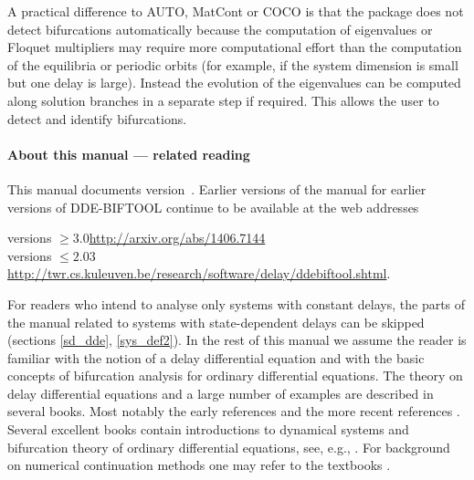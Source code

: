 \documentclass[10pt]{scrartcl}
\newcommand{\DDEBIFCODE}{\textsc{DDE-BIFTOOL}}
\newcommand{\ddebifweb}{\url{https://sourceforge.net/projects/ddebiftool}}
\newcommand{\ddebifarx}{\url{http://arxiv.org/abs/1406.7144}}
\newcommand{\ddebifwebold}{\url{http://twr.cs.kuleuven.be/research/software/delay/ddebiftool.shtml}}
\begin{document}
A practical difference to AUTO, MatCont or \textsc{COCO} is that the package
does not detect bifurcations automatically because the computation of
eigenvalues or Floquet multipliers may require more computational
effort than the computation of the equilibria or periodic orbits (for
example, if the system dimension is small but one delay is
large). Instead the evolution of the eigenvalues can be computed along
solution branches in a separate step if required. This allows the user
to detect and identify bifurcations.



\paragraph{About this manual --- related reading}
This manual documents version~\version. Earlier versions of the manual
for earlier versions of \DDEBIFCODE{} continue to be available at the
web addresses
\begin{tabbing}
  versions $\geq3.0$\qquad \= \ddebifarx{}\\
  versions $\leq2.03$ \> \ddebifwebold{}.
\end{tabbing}
For readers who intend to analyse only systems with constant delays,
the parts of the manual related to systems with state-dependent delays
can be skipped (sections \ref{sd_dde}, \ref{sys_def2}).  In the rest
of this manual we assume the reader is familiar with the notion of a
delay differential equation and with the basic concepts of bifurcation
analysis for ordinary differential equations.  The theory on delay
differential equations and a large number of examples are described in
several books. Most notably the early references
\cite{Bell63,Driv77,El's73,Hale77a,Kolm86} and the more recent
references \cite{Azbe91,Kolm92,Hale93,Diek95,Kolm99}.  Several
excellent books contain introductions to dynamical systems and
bifurcation theory of ordinary differential equations, see, e.g.,
\cite{Argy94,Chow82,Guck83,Kuzn04,Seyd94}. For background on numerical
continuation methods one may refer to the textbooks
\cite{DS13,Doed07,G00}.
\end{document}
